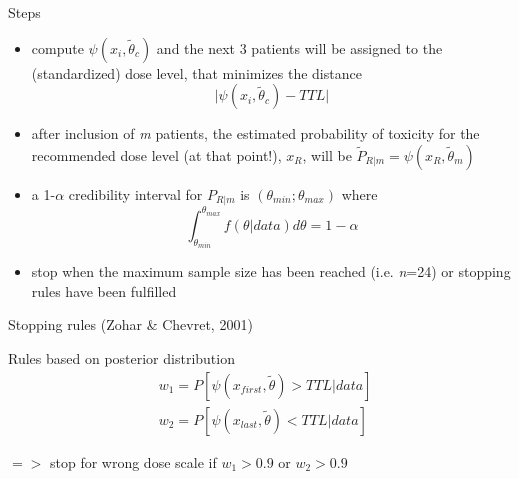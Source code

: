 \documentclass{beamer}
\begin{document}
\begin{frame}{Steps}

\begin{itemize}
\itemsep1pt\parskip0pt
\item
  compute \(\psi\left(x_{i},\tilde{\theta}_{c}\right)\) and the next 3
  patients will be assigned to the (standardized) dose level, that
  minimizes the distance
  \[\vert\psi\left(x_{i},\tilde{\theta}_{c}\right)-TTL\vert\]
\item
  after inclusion of \emph{m} patients, the estimated probability of
  toxicity for the recommended dose level (at that point!), \(x_{R}\),
  will be \(\tilde{P}_{R\vert m}=\psi\left(x_{R},\tilde{\theta}_{m}\right)\)
\item
  a 1-\(\alpha\) credibility interval for \(P_{R\vert m}\) is
  \(\left(\theta_{min};\theta_{max}\right)\) where\\\[ 
  \int_{\theta_{min}}^{\theta_{max}} f\left(\theta\vert data\right) d\theta=1-\alpha 
  \]
\item
  stop when the maximum sample size has been reached (i.e. \emph{n}=24)
  or stopping rules have been fulfilled
\end{itemize}

\end{frame}



\begin{frame}{Stopping rules (Zohar \& Chevret, 2001)}

Rules based on posterior distribution 
\begin{align}
          & w_{1} = P\left[ \psi\left(x_{first},\tilde{\theta} \right)>TTL\vert data \right] \\
          & w_{2} = P\left[ \psi\left(x_{last},\tilde{\theta} \right)<TTL\vert data \right] 
\end{align}


\(=>\) stop for wrong dose scale if \(w_{1}>0.9\) or \(w_{2}>0.9\)

\end{frame}
\end{document}
